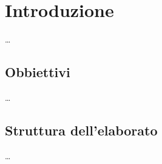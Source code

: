 \chapter{Introduzione}
\label{cap:introduzione}

\dots


%
%
\section{Obbiettivi}
\label{sec:obbiettivi}

\dots


%
%
\section{Struttura dell'elaborato}
\label{sec:organizzazione-elaborato}

\dots
